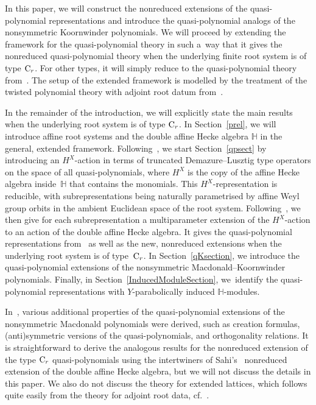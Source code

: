 \documentclass[pdftex]{sigma}
\numberwithin{equation}{section}
\begin{document}
{In this paper, we will construct the nonreduced extensions of the quasi-polynomial representations and introduce the quasi-polynomial analogs of the nonsymmetric Koornwinder polynomials.
We will proceed by extending the framework for the quasi-polynomial theory in such a~way that it gives the nonreduced quasi-polynomial theory when the underlying finite root system is of type ${\rm C}_r$.
For other types, it will simply reduce to the quasi-polynomial theory from~\cite{SSV2}.
 The setup of the extended framework is modelled by the treatment of the twisted polynomial theory with adjoint root datum from~\cite{StCh}.

In the remainder
of the introduction, we will explicitly state the main results when the underlying root system is of type ${\rm C}_r$. In Section~\ref{prel}, we will introduce affine root systems and the double affine Hecke algebra $\mathbb{H}$ in the general, extended framework.
Following~\cite{SSV1}, we start Section~\ref{qpsect} by
introducing an $H^X$-action in terms of truncated Demazure--Lusztig type operators on the space of all quasi-polynomials, where $H^X$ is the copy of the affine Hecke algebra inside~$\mathbb{H}$ that contains the monomials.
This $H^X$-representation is reducible, with subrepresentations being naturally parametrised by affine Weyl group orbits in the ambient Euclidean space of the root system.
Following~\cite{SSV2}, we then give for each subrepresentation a multiparameter extension of the $H^X$-action to an action of the double affine Hecke algebra.
It gives the quasi-polynomial representations from~\cite[Section~4]{SSV2} as well as the new, nonreduced extensions when the underlying root system is of
type~${\rm C}_r$.
In Section~\ref{qKsection}, we introduce the quasi-polynomial extensions of the nonsymmetric Macdonald--Koornwinder polynomials. Finally, in Section~\ref{InducedModuleSection}, we~identify the quasi-polynomial representations with $Y$-parabolically induced $\mathbb{H}$-modules.

 In~\cite[Section~6]{SSV2}, various additional properties of the quasi-polynomial extensions of the nonsymmetric Macdonald polynomials were derived, such as creation formulas, (anti)sym\-me\-tric versions of the quasi-polynomials, and orthogonality relations. It is straightforward to derive the analogous results for the nonreduced extension of the type ${\rm C}_r$ quasi-polynomials using the intertwiners of Sahi's~\cite{Sa} nonreduced extension of the double affine Hecke algebra, but we will not discuss the details in this paper.
We also do not discuss the theory for extended lattices, which follows quite easily from the theory for adjoint root data, cf.~\cite[Section~7]{SSV2}.

}
\end{document}
